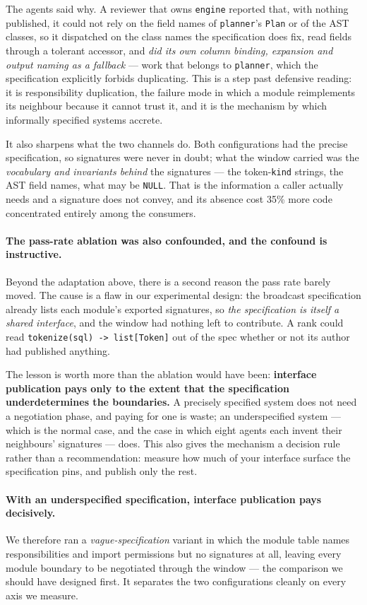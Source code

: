 \documentclass[10pt,twocolumn]{article}
\theoremstyle{definition}
\theoremstyle{plain}
\newcommand{\code}[1]{\texttt{\small #1}}
\begin{document}
The agents said why. A reviewer that owns \code{engine} reported that, with nothing
published, it could not rely on the field names of \code{planner}'s \code{Plan} or of the
AST classes, so it dispatched on the class names the specification does fix, read fields
through a tolerant accessor, and \emph{did its own column binding, \code{*} expansion and
output naming as a fallback} --- work that belongs to \code{planner}, which the
specification explicitly forbids duplicating. This is a step past defensive reading: it
is responsibility duplication, the failure mode in which a module reimplements its
neighbour because it cannot trust it, and it is the mechanism by which informally
specified systems accrete.

It also sharpens what the two channels do. Both configurations had the precise
specification, so signatures were never in doubt; what the window carried was the
\emph{vocabulary and invariants behind} the signatures --- the token-\code{kind}
strings, the AST field names, what may be \code{NULL}. That is the information a caller
actually needs and a signature does not convey, and its absence cost 35\% more code
concentrated entirely among the consumers.

\paragraph{The pass-rate ablation was also confounded, and the confound is
instructive.} Beyond the adaptation above, there is a second reason the pass rate
barely moved. The
cause is a flaw in our experimental design: the broadcast specification already lists
each module's exported signatures, so \emph{the specification is itself a shared
interface}, and the window had nothing left to contribute. A rank could read
\code{tokenize(sql) -> list[Token]} out of the spec whether or not its author had
published anything.

The lesson is worth more than the ablation would have been:
\textbf{interface publication pays only to the extent that the specification
underdetermines the boundaries.} A precisely specified system does not need a
negotiation phase, and paying for one is waste; an underspecified system --- which is
the normal case, and the case in which eight agents each invent their neighbours'
signatures --- does. This also gives the mechanism a decision rule rather than a
recommendation: measure how much of your interface surface the specification pins, and
publish only the rest.

\paragraph{With an underspecified specification, interface publication pays
decisively.} We therefore ran a \emph{vague-specification} variant in which the module
table names responsibilities and import permissions but no signatures at all, leaving
every module boundary to be negotiated through the window --- the comparison we should
have designed first. It separates the two configurations cleanly on every axis we
measure.
\end{document}
